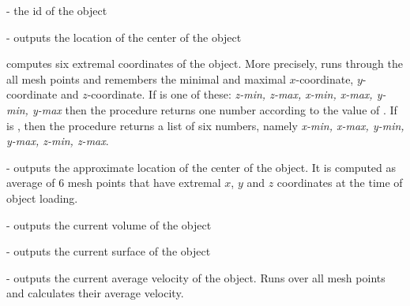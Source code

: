 \begin{arguments}
\item[\var{oid}] - the id of the object
\item[\opt{origin}] - outputs the location of the center of the object
\item[\opt{pos-bounds \var{bname}}] computes six extremal coordinates of the object. More precisely, runs through the all mesh points and remembers the minimal and maximal $x$-coordinate, $y$-coordinate and $z$-coordinate. If  is one of these: \textit{z-min, z-max, x-min, x-max, y-min, y-max} then the procedure returns one number according to the value of . If  is , then the procedure returns a list of six numbers, namely \textit{x-min, x-max, y-min, y-max, z-min, z-max}.
\item[\opt{approx-pos}] - outputs the approximate location of the center of the object. It is computed as average of 6 mesh points that have extremal $x$, $y$ and $z$ coordinates at the time of object loading.
\item[\opt{volume}] - outputs the current volume of the object
\item[\opt{surface-area}] - outputs the current surface of the object
\item[\opt{velocity}] - outputs the current average velocity of the object. Runs over all mesh points and calculates their average velocity.

\end{arguments}
